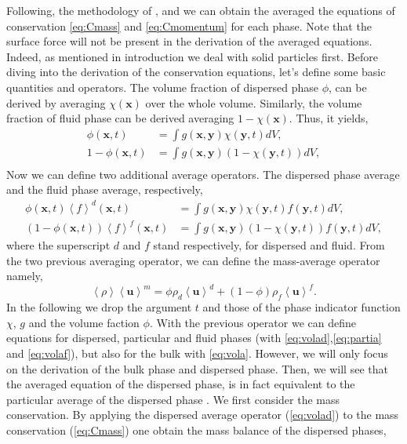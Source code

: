 Following, the methodology of \citet{jackson1997locally}, \citet{morel2015mathematical} and \citet{nott2011suspension} we can obtain the averaged the equations of conservation \ref{eq:Cmass} and \ref{eq:Cmomentum} for each phase. 
Note that the surface force will not be present in the derivation of the averaged equations.
Indeed, as mentioned in introduction we deal with solid particles first.
Before diving into the derivation of the conservation equations, let's define some basic quantities and operators. 
The volume fraction of dispersed phase $\phi$, can be derived by averaging $\chi(\bm{x})$ over the whole volume.
Similarly, the volume fraction of fluid phase can be derived averaging $1 - \chi(\bm{x})$.
Thus, it yields, 
\begin{align}
    \phi(\bm{x},t) &= \int g(\bm{x},\bm{y}) \chi(\bm{y},t)dV,\\
    1 -\phi(\bm{x},t) &= \int g(\bm{x},\bm{y}) (1 - \chi(\bm{y},t))dV,\\
\end{align}
Now we can define two additional average operators.
The dispersed phase average and the fluid phase average, respectively,
\begin{align}
    \label{eq:volad}
    \phi(\bm{x},t)\left<f\right>^d(\bm{x},t) &= \int g(\bm{x},\bm{y}) \chi(\bm{y},t) f(\bm{y},t)dV,\\
    \label{eq:volaf}
    (1-\phi(\bm{x},t))\left<f\right>^f(\bm{x},t) &= \int g(\bm{x},\bm{y}) (1-\chi(\bm{y},t)) f(\bm{y},t)dV,
\end{align}
where the superscript $d$ and $f$ stand respectively, for dispersed and fluid. 
From the two previous averaging operator, we can define the mass-average operator namely,
\begin{equation}
    \left<\rho\right>\left<\bm{u}\right>^m = \phi \rho_d\left<\bm{u}\right>^d+(1-\phi) \rho_f\left<\bm{u}\right>^f.
\end{equation}
In the following we drop the argument $t$ and those of the phase indicator function $\chi$, $g$ and the volume faction $\phi$. 
With the previous operator we can define equations for dispersed, particular and fluid phases (with \ref{eq:volad},\ref{eq:partia} and \ref{eq:volaf}), but also for the bulk with \ref{eq:vola}.
However, we will only focus on the derivation of the bulk phase and dispersed phase. 
Then, we will see that the averaged equation of the dispersed phase, is in fact equivalent to the particular average of the dispersed phase \citep{nott2011suspension}.  
We first consider the mass conservation. 
By applying the dispersed average operator (\ref{eq:volad}) to the mass conservation (\ref{eq:Cmass}) one obtain the mass balance of the dispersed phases,   
